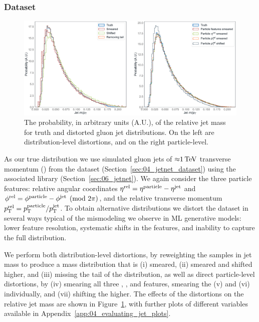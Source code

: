 \subsubsection{Dataset}
\label{sec:04_evaluating_jetdata_dataset}

\begin{figure}[ht]
    \includegraphics[width=\textwidth]{figures/04-ML4Sim/evaluating/jet_mass_dists.pdf}
    \caption{The probability, in arbitrary units (A.U.), of the relative jet mass for truth and distorted gluon jet distributions.
    On the left are distribution-level distortions, and on the right particle-level.}
    \label{fig:04_evaluating_jetdists}
\end{figure}

As our true distribution we use simulated gluon jets of ${\approx}1\,\text{Te\hspace{-.08em}V}$ transverse momentum (\pt) from the \jetnet dataset (Section~\ref{sec:04_jetnet_dataset}) using the associated \jetnet library (Section~\ref{sec:06_jetnet}).
We again consider the three particle features: relative angular coordinates
$\eta^{\mathrm{rel}} =\eta^{\mathrm{particle}} - \eta^{\mathrm{jet}}$ and
$\phi^{\mathrm{rel}} =\phi^{\mathrm{particle}} - \phi^{\mathrm{jet}} \pmod{2\pi}$, and the relative transverse momentum
$p_{\mathrm{T}}^{\mathrm{rel}} = p_{\mathrm{T}}^{\mathrm{particle}}/p_{\mathrm{T}}^{\mathrm{jet}}$.
To obtain alternative distributions we distort the dataset in several ways typical of the mismodeling we observe in ML generative models: lower feature resolution, systematic shifts in the features, and inability to capture the full distribution.

We perform both distribution-level distortions, by reweighting the samples in jet mass to produce a mass distribution that is (i) smeared, (ii) smeared and shifted higher, and (iii) missing the tail of the distribution, as well as direct particle-level distortions, by (iv) smearing all three \phirel, \etarel, and \ptrel features, smearing the (v) \ptrel and (vi) \etarel individually, and (vii) shifting the \ptrel higher.
The effects of the distortions on the relative jet mass are shown in Figure~\ref{fig:04_evaluating_jetdists}, with further plots of different variables available in Appendix~\ref{app:04_evaluating_jet_plots}.

